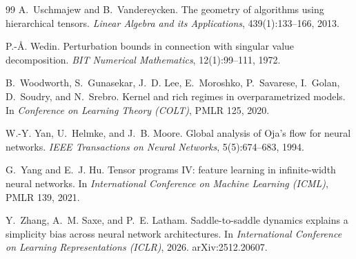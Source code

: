 \documentclass[11pt]{article}
\theoremstyle{definition}
\numberwithin{equation}{section}
\begin{document}
\begin{thebibliography}{99}
A.~Uschmajew and B.~Vandereycken.
\newblock The geometry of algorithms using hierarchical tensors.
\newblock \emph{Linear Algebra and its Applications}, 439(1):133--166, 2013.

P.-{\AA}. Wedin.
\newblock Perturbation bounds in connection with singular value decomposition.
\newblock \emph{BIT Numerical Mathematics}, 12(1):99--111, 1972.

B.~Woodworth, S.~Gunasekar, J.~D. Lee, E.~Moroshko, P.~Savarese, I.~Golan, D.~Soudry, and N.~Srebro.
\newblock Kernel and rich regimes in overparametrized models.
\newblock In \emph{Conference on Learning Theory (COLT)}, PMLR 125, 2020.

W.-Y. Yan, U.~Helmke, and J.~B. Moore.
\newblock Global analysis of {O}ja's flow for neural networks.
\newblock \emph{IEEE Transactions on Neural Networks}, 5(5):674--683, 1994.

G.~Yang and E.~J. Hu.
\newblock Tensor programs {IV}: feature learning in infinite-width neural networks.
\newblock In \emph{International Conference on Machine Learning (ICML)}, PMLR 139, 2021.

Y.~Zhang, A.~M. Saxe, and P.~E. Latham.
\newblock Saddle-to-saddle dynamics explains a simplicity bias across neural network architectures.
\newblock In \emph{International Conference on Learning Representations (ICLR)}, 2026. arXiv:2512.20607.

\end{thebibliography}
\end{document}
